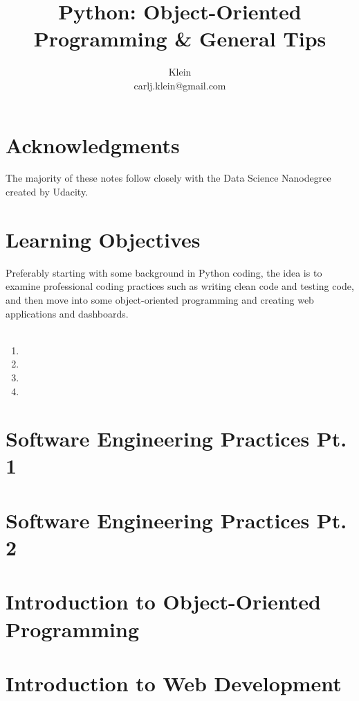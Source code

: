\documentclass{article}
\begin{document}
	\title{Python: Object-Oriented Programming \& General Tips}
	\author{Klein \\ carlj.klein@gmail.com}
	\date{}
	\maketitle

\section{Acknowledgments}
The majority of these notes follow closely with the Data Science Nanodegree created by Udacity.

\section{Learning Objectives}
Preferably starting with some background in Python coding, the idea is to examine professional coding practices such as writing clean code and testing code, and then move into some object-oriented programming and creating web applications and dashboards.
\\\\

\begin{enumerate}
	\item {}
	\item {}
	\item {}
	\item {}
\end{enumerate}

\section{Software Engineering Practices Pt. 1}\label{sec:concept1}

	
\section{Software Engineering Practices Pt. 2}\label{sec:concept2}


\section{Introduction to Object-Oriented Programming}\label{sec:concept3}


\section{Introduction to Web Development}\label{sec:concept4}
%
	
\end{document}
